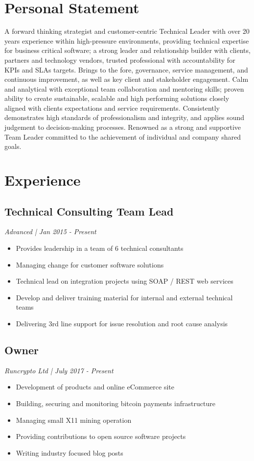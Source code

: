 \documentclass[]{article}
\begin{document}
\begin{minipage}[t]{0.60\textwidth}
%
%
%
\section{Personal Statement}
A forward thinking strategist and customer-centric Technical Leader with over 20 years experience within high-pressure environments, providing technical expertise for business critical software; a strong leader and relationship builder with clients, partners and technology vendors, trusted professional with accountability for KPIs and SLAs targets. Brings to the fore, governance, service management, and continuous improvement, as well as key client and stakeholder engagement. Calm and analytical with exceptional team collaboration and mentoring skills; proven ability to create sustainable, scalable and high performing solutions closely aligned with clients expectations and service requirements. Consistently demonstrates high standards of professionalism and integrity, and applies sound judgement to decision-making processes. Renowned as a strong and supportive Team Leader committed to the achievement of individual and company shared goals.
%
%
%
\vspace{-12pt}
\section{Experience}
	\subsection{Technical Consulting Team Lead}
	\textit{ Advanced | Jan 2015 - Present }
	\begin{itemize}
	\vspace{6pt}
		\item Provides leadership in a team of 6 technical consultants
		\item Managing change for customer software solutions
		\item Technical lead on integration projects using SOAP / REST web services
		\item Develop and deliver training material for internal and external technical teams
		\item Delivering 3rd line support for issue resolution and root cause analysis
	\end{itemize}
	\subsection{Owner}
	\textit{ Runcrypto Ltd | July 2017 - Present }
	\begin{itemize}
		\item Development of products and online eCommerce site
		\item Building, securing and monitoring bitcoin payments infrastructure
		\item Managing small X11 mining operation
		\item Providing contributions to open source software projects
		\item Writing industry focused blog posts
	\end{itemize}

\end{minipage}
\end{document}
